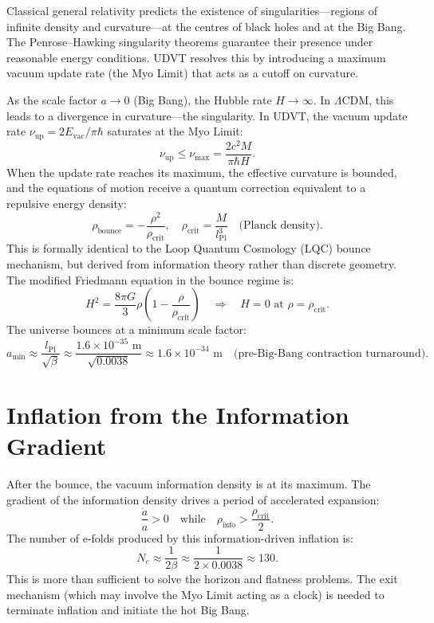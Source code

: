 \documentclass[12pt,a4paper]{book}
\theoremstyle{definition}
\theoremstyle{remark}
\begin{document}
Classical general relativity predicts the existence of singularities---regions of infinite density and curvature---at the centres of black holes and at the Big Bang. The Penrose--Hawking singularity theorems guarantee their presence under reasonable energy conditions. UDVT resolves this by introducing a maximum vacuum update rate (the Myo Limit) that acts as a cutoff on curvature.

As the scale factor $a \rightarrow 0$ (Big Bang), the Hubble rate $H \rightarrow \infty$. In $\Lambda$CDM, this leads to a divergence in curvature---the singularity. In UDVT, the vacuum update rate $\nu_{\mathrm{up}} = 2E_{\mathrm{vac}}/\pi\hbar$ saturates at the Myo Limit:
\begin{equation}
    \nu_{\mathrm{up}} \leq \nu_{\mathrm{max}} = \frac{2c^2 M}{\pi\hbar H}.
\end{equation}
When the update rate reaches its maximum, the effective curvature is bounded, and the equations of motion receive a quantum correction equivalent to a repulsive energy density:
\begin{equation}
    \rho_{\mathrm{bounce}} = -\frac{\rho^2}{\rho_{\mathrm{crit}}}, \quad \rho_{\mathrm{crit}} = \frac{M}{l_{\mathrm{Pl}}^3} \quad \text{(Planck density)}.
\end{equation}
This is formally identical to the Loop Quantum Cosmology (LQC) bounce mechanism, but derived from information theory rather than discrete geometry. The modified Friedmann equation in the bounce regime is:
\begin{equation}
    H^2 = \frac{8\pi G}{3}\rho\left(1 - \frac{\rho}{\rho_{\mathrm{crit}}}\right) \quad \Rightarrow \quad H = 0 \text{ at } \rho = \rho_{\mathrm{crit}}.
\end{equation}
The universe bounces at a minimum scale factor:
\begin{equation}
    a_{\mathrm{min}} \approx \frac{l_{\mathrm{Pl}}}{\sqrt{\beta}} \approx \frac{1.6 \times 10^{-35} \text{ m}}{\sqrt{0.0038}} \approx 1.6 \times 10^{-34} \text{ m} \quad \text{(pre-Big-Bang contraction turnaround)}.
\end{equation}

\section{Inflation from the Information Gradient}

After the bounce, the vacuum information density is at its maximum. The gradient of the information density drives a period of accelerated expansion:
\begin{equation}
    \frac{\ddot{a}}{a} > 0 \quad \text{while} \quad \rho_{\mathrm{info}} > \frac{\rho_{\mathrm{crit}}}{2}.
\end{equation}
The number of e-folds produced by this information-driven inflation is:
\begin{equation}
    N_e \approx \frac{1}{2\beta} \approx \frac{1}{2 \times 0.0038} \approx 130.
\end{equation}
This is more than sufficient to solve the horizon and flatness problems. The exit mechanism (which may involve the Myo Limit acting as a clock) is needed to terminate inflation and initiate the hot Big Bang.
\end{document}
